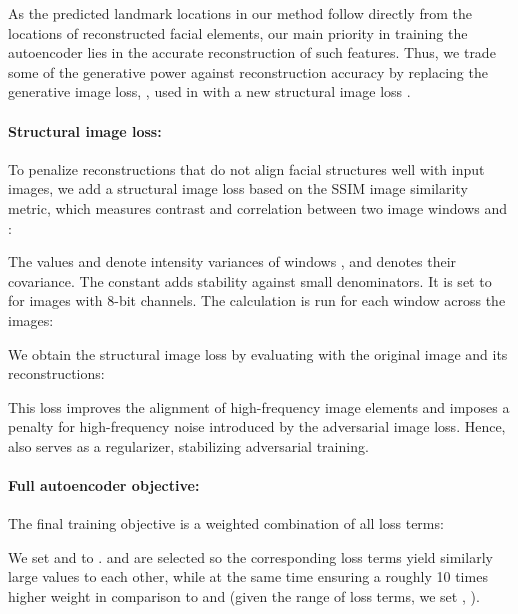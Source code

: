 \documentclass[10pt,twocolumn,letterpaper]{article}
\begin{document}
As the predicted landmark locations in our method follow directly from the locations of reconstructed facial elements, our main priority in training the autoencoder lies in the accurate reconstruction of such features. Thus, we trade some of the generative power against reconstruction accuracy by replacing the generative image loss, , used in \cite{browatzki2019robust} with a new structural image loss  . 











\vspace{-0.0cm}\paragraph{Structural image loss:} 
To penalize reconstructions that do not align facial structures well with input images, we add a structural image loss based on the SSIM\cite{wang2003multiscale} image similarity metric, which measures contrast  and correlation  between two image windows  and :



The values  and  denote intensity variances of windows , and  denotes their covariance.  The constant  adds stability against small denominators. It is set to  for images with 8-bit channels. The calculation is run for each  window across the images:



We obtain the structural image loss by evaluating  with the original image and its reconstructions:

\vspace{-0.4cm}


This loss improves the alignment of high-frequency image elements and imposes a penalty for high-frequency noise introduced by the adversarial image loss. Hence,  also serves as a regularizer, stabilizing adversarial training.

\vspace{-0.2cm}\paragraph{Full autoencoder objective:} The final training objective is a weighted combination of all loss terms:


We set  and  to .  and  are selected so the corresponding loss terms yield similarly large values to each other, while at the same time ensuring a roughly 10 times higher weight in comparison to   and  (given the range of loss terms, we set , ).
\end{document}
